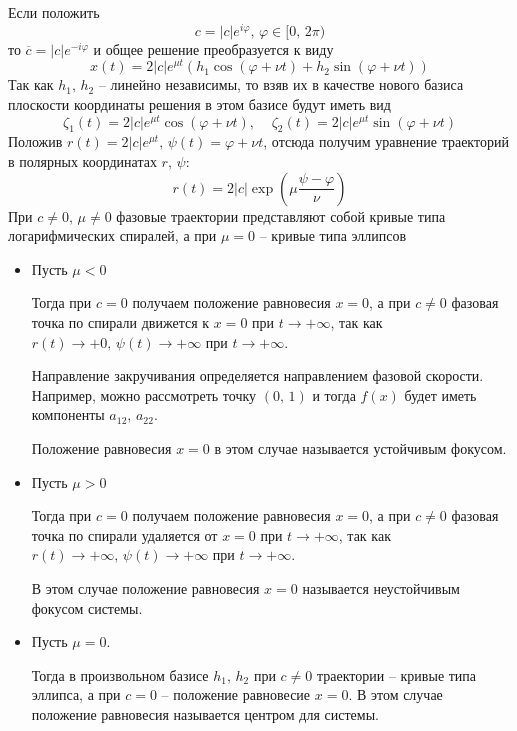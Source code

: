 \documentclass[a4paper,12pt]{article}
\renewcommand{\phi}{\ensuremath{\varphi}}
\theoremstyle{plain}
\theoremstyle{definition}
\theoremstyle{remark}
\begin{document}
\begin{enumerate}
	      Если положить
	      \[c = |c|e^{i\phi},\, \phi \in [0,\,2\pi)\]
	      то $\overline{c} = |c|e^{-i\phi}$ и общее решение преобразуется к виду
	      \[x(t) = 2|c|e^{\mu t}(h_1\cos(\phi + \nu t) + h_2\sin(\phi + \nu t))\]
	      Так как $h_1,\,h_2$ -- линейно независимы, то взяв их в качестве нового базиса плоскости координаты решения в этом базисе будут иметь вид
	      \[\zeta_1(t) = 2|c|e^{\mu t}\cos(\phi + \nu t),\;\;\;\; \zeta_2(t) = 2|c|e^{\mu t}\sin(\phi  + \nu t)\]
	      Положив $r(t) = 2|c|e^{\mu t},\, \psi(t) = \phi + \nu t$, отсюда получим уравнение траекторий в полярных координатах $r,\,\psi$:
	      \[r(t) = 2|c|\exp\left(\mu\frac{\psi - \phi}{\nu}\right)\]
	      При $c \neq 0,\, \mu \neq 0$ фазовые траектории представляют собой кривые типа логарифмических спиралей, а при $\mu = 0$ -- кривые типа эллипсов
	      \begin{itemize}
		      \item Пусть $\mu < 0$

		            Тогда при $c = 0$ получаем положение равновесия $x = 0$, а при $c \neq 0$ фазовая точка по спирали движется к $x = 0$ при $t \to +\infty$, так как $r(t) \to +0,\, \psi(t) \to +\infty$ при $t \to +\infty$.

		            Направление закручивания определяется направлением фазовой скорости. Например, можно рассмотреть точку $(0,\, 1)$ и тогда $f(x)$ будет иметь компоненты $a_{12},\, a_{22}$.

		            Положение равновесия $x = 0$ в этом случае называется устойчивым фокусом.
		      \item Пусть $\mu > 0$

		            Тогда при $c = 0$ получаем положение равновесия $x = 0$, а при $c \neq 0$ фазовая точка по спирали удаляется от $x = 0$ при $t \to +\infty$, так как $r(t) \to +\infty,\, \psi(t) \to +\infty$ при $t \to +\infty$.

		            В этом случае положение равновесия $x = 0$ называется неустойчивым фокусом системы.
		      \item Пусть $\mu = 0$.

		            Тогда в произвольном базисе $h_1,\,h_2$ при $c \neq 0$ траектории -- кривые типа эллипса, а при $c = 0$ -- положение равновесие $x = 0$. В этом случае положение равновесия называется центром для системы.
	      \end{itemize}
\end{enumerate}
\end{document}

